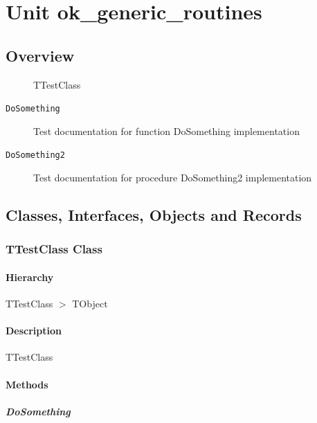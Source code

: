 \documentclass{report}
\begin{document}
\newlength{\tmplength}
\chapter{Unit ok{\_}generic{\_}routines}
\section{Overview}
\begin{description}
\item[\texttt{\begin{ttfamily}TTestClass\end{ttfamily} Class}]TTestClass
\end{description}
\begin{description}
\item[\texttt{DoSomething}]Test documentation for function DoSomething implementation
\item[\texttt{DoSomething2}]Test documentation for procedure DoSomething2 implementation
\end{description}
\section{Classes, Interfaces, Objects and Records}
\subsection*{TTestClass Class}
\subsubsection*{\large{\textbf{Hierarchy}}\normalsize\hspace{1ex}\hfill}
TTestClass {$>$} TObject
\subsubsection*{\large{\textbf{Description}}\normalsize\hspace{1ex}\hfill}
TTestClass\subsubsection*{\large{\textbf{Methods}}\normalsize\hspace{1ex}\hfill}
\paragraph*{DoSomething}\hspace*{\fill}
\end{document}
